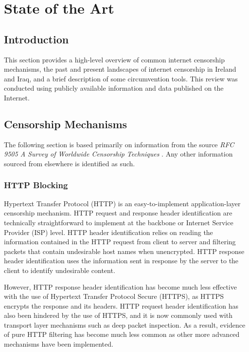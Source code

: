 \chapter{State of the Art}
\label{sec:State-of-the-Art}

\section{Introduction}

This section provides a high-level overview of common internet censorship mechanisms, the past and present landscapes of internet censorship in Ireland and Iraq, and a brief description of some circumvention tools. This review was conducted using publicly available information and data published on the Internet.

\section{Censorship Mechanisms}

The following section is based primarily on information from the source \textit{RFC 9505
A Survey of Worldwide Censorship Techniques} \cite{rfc9505}. Any other information sourced from elsewhere is identified as such.

\subsection{HTTP Blocking}

Hypertext Transfer Protocol (HTTP) is an easy-to-implement application-layer censorship mechanism. HTTP request and response header identification are technically straightforward to implement at the backbone or Internet Service Provider (ISP) level. HTTP header identification relies on reading the information contained in the HTTP request from client to server and filtering packets that contain undesirable host names when unencrypted. HTTP response header identification uses the information sent in response by the server to the client to identify undesirable content. 

However, HTTP response header identification has become much less effective with the use of Hypertext Transfer Protocol Secure (HTTPS), as HTTPS encrypts the response and its headers. HTTP request header identification has also been hindered by the use of HTTPS, and it is now commonly used with transport layer mechanisms such as deep packet inspection. As a result, evidence of pure HTTP filtering has become much less common as other more advanced mechanisms have been implemented. 


